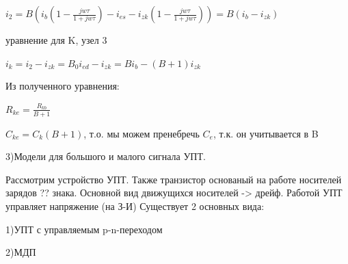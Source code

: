 \documentclass[12pt,a4paper]{article}
\begin{document}
$i_2=B(i_b(1- \frac{jw\tau}{1+ jw\tau })-i_{es}-i_{zk}(1- \frac{jw\tau}{1+ jw\tau }))=B(i_b-i_{zk})$

уравнение для K, узел 3

$i_k=i_2-i_{zk}=B_0 i_{ed} - i_{zk}=Bi_b - (B+1)i_{zk}$

Из полученного уравнения:

$R_{ke} = \frac{ R_{kb} }{B+1}$

$C_{ke} = C_k(B+1)$, т.о. мы можем пренебречь $C_e$, т.к. он учитывается в B
\begin{center}
\begin{figure}[h!]
		\label{}
	\end{figure}
\end{center}


3)Модели для большого и малого сигнала УПТ.

Рассмотрим устройство УПТ. Также транзистор основаный на работе носителей зарядов ?? знака. Основной вид движущихся носителей -> дрейф. Работой УПТ управляет напряжение (на З-И)
Существует 2 основных вида:

1)УПТ с управляемым p-n-переходом

2)МДП 
\end{document}
